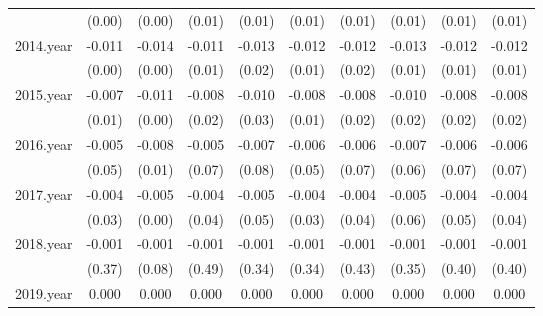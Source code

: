 {\begin{tabular}{l*{9}{c}}
          &   (0.00)         &   (0.00)         &   (0.01)         &   (0.01)         &   (0.01)         &   (0.01)         &   (0.01)         &   (0.01)         &   (0.01)         \\
[1em]
2014.year &   -0.011\sym{**} &   -0.014\sym{***}&   -0.011\sym{*}  &   -0.013\sym{*}  &   -0.012\sym{**} &   -0.012\sym{*}  &   -0.013\sym{*}  &   -0.012\sym{*}  &   -0.012\sym{*}  \\
          &   (0.00)         &   (0.00)         &   (0.01)         &   (0.02)         &   (0.01)         &   (0.02)         &   (0.01)         &   (0.01)         &   (0.01)         \\
[1em]
2015.year &   -0.007\sym{**} &   -0.011\sym{**} &   -0.008\sym{*}  &   -0.010\sym{*}  &   -0.008\sym{*}  &   -0.008\sym{*}  &   -0.010\sym{*}  &   -0.008\sym{*}  &   -0.008\sym{*}  \\
          &   (0.01)         &   (0.00)         &   (0.02)         &   (0.03)         &   (0.01)         &   (0.02)         &   (0.02)         &   (0.02)         &   (0.02)         \\
[1em]
2016.year &   -0.005\sym{*}  &   -0.008\sym{*}  &   -0.005         &   -0.007         &   -0.006         &   -0.006         &   -0.007         &   -0.006         &   -0.006         \\
          &   (0.05)         &   (0.01)         &   (0.07)         &   (0.08)         &   (0.05)         &   (0.07)         &   (0.06)         &   (0.07)         &   (0.07)         \\
[1em]
2017.year &   -0.004\sym{*}  &   -0.005\sym{**} &   -0.004\sym{*}  &   -0.005         &   -0.004\sym{*}  &   -0.004\sym{*}  &   -0.005         &   -0.004\sym{*}  &   -0.004\sym{*}  \\
          &   (0.03)         &   (0.00)         &   (0.04)         &   (0.05)         &   (0.03)         &   (0.04)         &   (0.06)         &   (0.05)         &   (0.04)         \\
[1em]
2018.year &   -0.001         &   -0.001         &   -0.001         &   -0.001         &   -0.001         &   -0.001         &   -0.001         &   -0.001         &   -0.001         \\
          &   (0.37)         &   (0.08)         &   (0.49)         &   (0.34)         &   (0.34)         &   (0.43)         &   (0.35)         &   (0.40)         &   (0.40)         \\
[1em]
2019.year &    0.000         &    0.000         &    0.000         &    0.000         &    0.000         &    0.000         &    0.000         &    0.000         &    0.000         \\

\end{tabular}}
